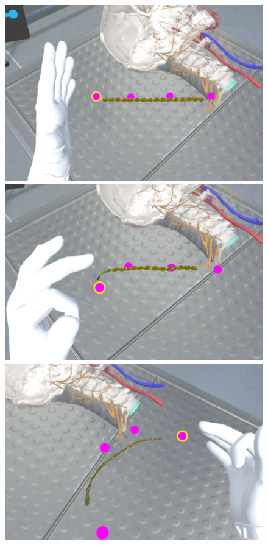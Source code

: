 \begin{figure}
  \centering
  \begin{minipage}{.5\textwidth}
    \centering
    \includegraphics[width=0.997\linewidth]{images/implementation/features/procedures/osteo_1.png}
  \end{minipage}%
  \begin{minipage}{.5\textwidth}
    \centering
    \includegraphics[width=0.997\linewidth]{images/implementation/features/procedures/osteo_2.png}
  \end{minipage}
  \begin{minipage}{.5\textwidth}
    \centering
    \includegraphics[width=0.997\linewidth]{images/implementation/features/procedures/osteo_3.png}

\end{minipage}
\end{figure}
